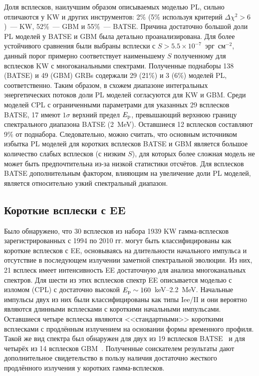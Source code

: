Доля всплесков, наилучшим образом описываемых моделью PL, сильно отличаются у KW и
других инструментов:
2\% (5\% используя критерий $\Delta \chi^2 > 6$)~--- KW, 52\%~--- GBM и 55\%~--- BATSE.
Причина достаточно большой доли PL моделей у BATSE и GBM была детально проанализирована.
Для более устойчивого сравнения были выбраны всплески с $S>5.5\times 10^{-7}$~эрг~см$^{-2}$,
данный порог примерно соответствует наименьшему $S$ полученному для всплесков KW с многоканальными
спектрами. Полученные поднаборы 138 (BATSE) и 49 (GBM) GRBs содержали 29 (21\%) и 3 (6\%) моделей PL, соответственно. 
Таким образом, в схожем диапазоне интегральных энергетических потоков доли PL моделей
согласуются для KW и GBM.
Среди моделей CPL с ограниченными параметрами для указанных 29 всплесков BATSE,
17 имеют $1\sigma$ верхний предел $E_{\mathrm{p}}$, превышающий верхнюю границу 
спектрального диапазона  BATSE (2~MeV). Оставшиеся 12 всплесков составляют 9\% от поднабора. 
Следовательно, можно считать, что основным источником избытка PL моделей для коротких 
всплесков BATSE и GBM является большое количество слабых всплесков (с низким $S$),
для которых более сложная модель не может быть предпочтительна из-за низкой статистики отсчётов.
Для всплесков BATSE дополнительным фактором, влияющим на увеличение доли PL моделей, 
является относительно узкий спектральный диапазон.

\subsection{Короткие всплески с EE}
Было обнаружено, что 30 всплесков из набора 1939 KW гамма-всплесков зарегистрированных
с 1994 по 2010 гг. могут быть классифицированы как короткие всплесков с EE, 
основываясь на длительности начального импульса и отсутствие в последующем излучении 
заметной спектральной эволюции. Из них, 21 всплеск имеет интенсивность EE достаточную
для анализа многоканальных спектров. Для шести из этих всплесков спектр EE описывается
моделью с изломом (CPL) с достаточно высокой $E_{\mathrm{p}} \sim 160$~keV--2.2~MeV.
Начальные импульсы двух из них были классифицированы как типы Iee/II и они вероятно
являются длинными всплесками с короткими начальными импульсами. Оставшиеся четыре всплеска 
являются <<стандартными>> короткими всплесками с продлённым излучением на основании 
формы временного профиля. Такой же вид спектра был обнаружен для двух из 19 всплесков BATSE~\citep{Bostanci_2013MNRAS}
и для четырёх из 14 всплесков GBM~\citep{Kaneko_2015MNRAS}. 
Полученные соискателем результаты дают дополнительное свидетельство в пользу наличия 
достаточно жесткого продлённого излучения у коротких гамма-всплесков. 

